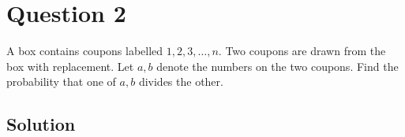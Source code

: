 \section*{Question 2}

A box contains coupons labelled \( 1, 2, 3, \dots , n \).
Two coupons are drawn from the box with replacement.
Let \(a,b\) denote the numbers on the two coupons.
Find the probability that one of \(a,b\) divides the other.

\subsection*{Solution}
